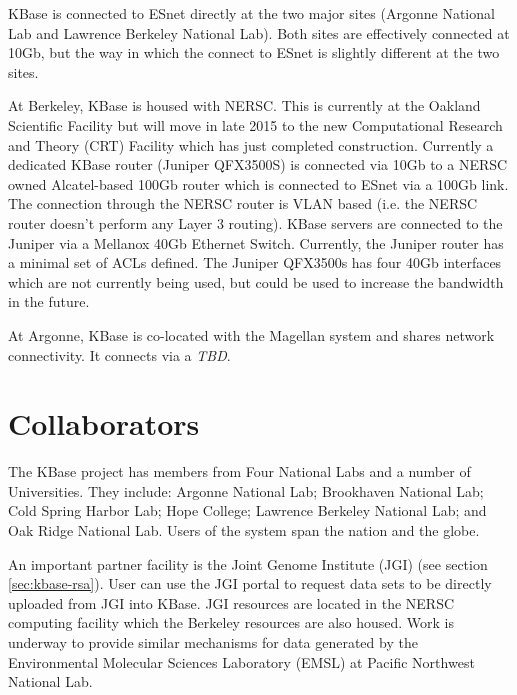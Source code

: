 \documentclass[10pt,a4paper]{report}
\begin{document}
KBase is connected to ESnet directly at the two major sites (Argonne National Lab and Lawrence Berkeley National Lab).  Both sites are effectively connected at 10Gb, but the way in which the connect to ESnet is slightly different at the two sites.

At Berkeley, KBase is housed with NERSC.  This is currently at the Oakland Scientific Facility but will move in late 2015 to the new Computational Research and Theory (CRT) Facility which has just completed construction.  Currently a dedicated KBase router (Juniper QFX3500S) is connected via 10Gb to a NERSC owned Alcatel-based 100Gb router which is connected to ESnet via a 100Gb link.  The connection through the NERSC router is VLAN based (i.e. the NERSC router doesn't perform any Layer 3 routing).  KBase servers are connected to the Juniper via a Mellanox 40Gb Ethernet Switch.  Currently, the Juniper router has a minimal set of ACLs defined.  The Juniper QFX3500s has four 40Gb interfaces which are not currently being used, but could be used to increase the bandwidth in the future.

At Argonne, KBase is co-located with the Magellan system and shares network connectivity.  It connects via a {\em TBD}.

\section{Collaborators}

The KBase project has members from Four National Labs and a number of Universities.   They include:
Argonne National Lab; Brookhaven National Lab; Cold Spring Harbor Lab; Hope College; 
Lawrence Berkeley National Lab; and Oak Ridge National Lab.
Users of the system span the nation and the globe.  

An important partner facility is the Joint Genome Institute (JGI) (see section \ref{sec:kbase-rsa}).  User can use the JGI portal to request data sets to be directly uploaded from JGI into KBase.  JGI resources are located in the NERSC computing facility which the Berkeley resources are also housed.
Work is underway to provide similar mechanisms for data generated by the Environmental Molecular Sciences Laboratory (EMSL) at Pacific Northwest National Lab.
\end{document}
